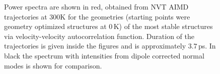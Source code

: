 \documentclass[11pt,DIV=13,BCOR=5mm,a4paper,headinclude]{scrbook}
\begin{document}
\begin{figure}[!h]
    \centering
             \quad
             \quad
             \caption{Power spectra are shown in red, obtained from NVT AIMD trajectories at 300K for the geometries (starting points were geometry optimized structures at $0\,$K) of the most stable structures via velocity-velocity autocorrelation function.
Duration of the trajectories is given inside the figures and is approximately $3.7\,$ps.
In black the spectrum with intensities from dipole corrected normal modes is shown for comparison.}
            \label{abb:velvel_ads_spec}
\end{figure}
\end{document}
